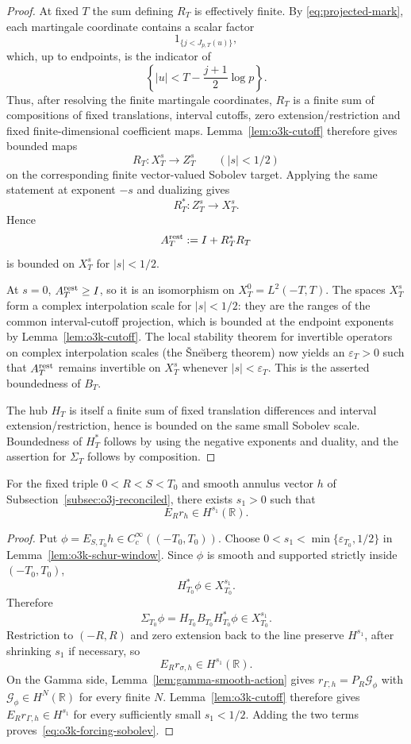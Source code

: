 \begin{proof}
At fixed $T$ the sum defining $R_T$ is effectively finite.  By
\eqref{eq:projected-mark}, each martingale coordinate contains a scalar factor
\[
 1_{\{j<J_{p,T}(u)\}},
\]
which, up to endpoints, is the indicator of
\[
 \left\{|u|<T-\frac{j+1}{2}\log p\right\}.
\]
Thus, after resolving the finite martingale coordinates, $R_T$ is a finite sum of
compositions of fixed translations, interval cutoffs, zero extension/restriction and
fixed finite-dimensional coefficient maps.  Lemma~\ref{lem:o3k-cutoff} therefore gives
bounded maps
\[
 R_T:X_T^s\longrightarrow Z_T^s
 \qquad(|s|<1/2)
\]
on the corresponding finite vector-valued Sobolev target.  Applying the same statement
at exponent $-s$ and dualizing gives
\[
 R_T^*:Z_T^s\longrightarrow X_T^s.
\]
Hence
\[
 A_T^{\rm rest}:=I+R_T^*R_T
\]
is bounded on $X_T^s$ for $|s|<1/2$.

At $s=0$, $A_T^{\rm rest}\ge I$, so it is an isomorphism on $X_T^0=L^2(-T,T)$.
The spaces $X_T^s$ form a complex interpolation scale for $|s|<1/2$: they are the
ranges of the common interval-cutoff projection, which is bounded at the endpoint
exponents by Lemma~\ref{lem:o3k-cutoff}.  The local stability theorem for invertible
operators on complex interpolation scales (the \v Sne\u\i berg theorem) now yields an
$\varepsilon_T>0$ such that $A_T^{\rm rest}$ remains invertible on $X_T^s$ whenever
$|s|<\varepsilon_T$.  This is the asserted boundedness of $B_T$.

The hub $H_T$ is itself a finite sum of fixed translation differences and interval
extension/restriction, hence is bounded on the same small Sobolev scale.  Boundedness of
$H_T^*$ follows by using the negative exponents and duality, and the assertion for
$\Sigma_T$ follows by composition.
\end{proof}

\begin{proposition}\label{prop:o3k-forcing}
For the fixed triple $0<R<S<T_0$ and smooth annulus vector $h$ of
Subsection~\ref{subsec:o3j-reconciled}, there exists $s_1>0$ such that
\[
 \boxed{E_Rr_h\in H^{s_1}(\mathbb R).}
\tag{OJ.12}\label{eq:o3k-forcing-sobolev}
\]
\end{proposition}

\begin{proof}
Put $\phi=E_{S,T_0}h\in C_c^\infty((-T_0,T_0))$.  Choose
$0<s_1<\min\{\varepsilon_{T_0},1/2\}$ in
Lemma~\ref{lem:o3k-schur-window}.  Since $\phi$ is smooth and supported strictly inside
$(-T_0,T_0)$,
\[
 H_{T_0}^*\phi\in X_{T_0}^{s_1}.
\]
Therefore
\[
 \Sigma_{T_0}\phi
 =H_{T_0}B_{T_0}H_{T_0}^*\phi
 \in X_{T_0}^{s_1}.
\]
Restriction to $(-R,R)$ and zero extension back to the line preserve $H^{s_1}$, after
shrinking $s_1$ if necessary, so
\[
 E_Rr_{\sigma,h}\in H^{s_1}(\mathbb R).
\]
On the Gamma side, Lemma~\ref{lem:gamma-smooth-action} gives
$r_{\Gamma,h}=P_R\mathcal G_\phi$ with
$\mathcal G_\phi\in H^N(\mathbb R)$ for every finite $N$.  Lemma~\ref{lem:o3k-cutoff}
therefore gives $E_Rr_{\Gamma,h}\in H^{s_1}$ for every sufficiently small
$s_1<1/2$.  Adding the two terms proves~\eqref{eq:o3k-forcing-sobolev}.
\end{proof}

